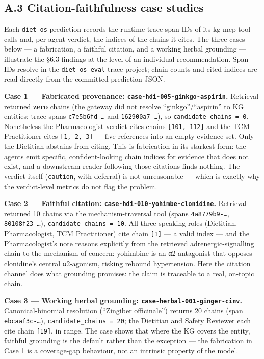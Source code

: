 \documentclass[
]{article}
\begin{document}
\hypertarget{a.3-citation-faithfulness-case-studies}{%
\subsection{A.3 Citation-faithfulness case
studies}\label{a.3-citation-faithfulness-case-studies}}

Each \texttt{diet\_os} prediction records the runtime trace-span IDs of
its kg-mcp tool calls and, per agent verdict, the indices of the chains
it cites. The three cases below --- a fabrication, a faithful citation,
and a working herbal grounding --- illustrate the §6.3 findings at the
level of an individual recommendation. Span IDs resolve in the
\texttt{diet-os-eval} trace project; chain counts and cited indices are
read directly from the committed prediction JSON.

\textbf{Case 1 --- Fabricated provenance:
\texttt{case-hdi-005-ginkgo-aspirin}.} Retrieval returned \textbf{zero}
chains (the gateway did not resolve ``ginkgo''/``aspirin'' to KG
entities; trace spans \texttt{c7e5b6fd-\ldots{}} and
\texttt{162900a7-\ldots{}}), so \texttt{candidate\_chains\ =\ 0}.
Nonetheless the Pharmacologist verdict cites chains
\texttt{{[}101,\ 112{]}} and the TCM Practitioner cites
\texttt{{[}1,\ 2,\ 3{]}} --- five references into an empty evidence set.
Only the Dietitian abstains from citing. This is fabrication in its
starkest form: the agents emit specific, confident-looking chain indices
for evidence that does not exist, and a downstream reader following
those citations finds nothing. The verdict itself (\texttt{caution},
with deferral) is not unreasonable --- which is exactly why the
verdict-level metrics do not flag the problem.

\textbf{Case 2 --- Faithful citation:
\texttt{case-hdi-010-yohimbe-clonidine}.} Retrieval returned 10 chains
via the mechanism-traversal tool (spans \texttt{4a8779b9-\ldots{}},
\texttt{80108f23-\ldots{}}), \texttt{candidate\_chains\ =\ 10}. All
three speaking roles (Dietitian, Pharmacologist, TCM Practitioner) cite
chain \texttt{{[}1{]}} --- a valid index --- and the Pharmacologist's
note reasons explicitly from the retrieved adrenergic-signalling chain
to the mechanism of concern: yohimbine is an α2-antagonist that opposes
clonidine's central α2-agonism, risking rebound hypertension. Here the
citation channel does what grounding promises: the claim is traceable to
a real, on-topic chain.

\textbf{Case 3 --- Working herbal grounding:
\texttt{case-herbal-001-ginger-cinv}.} Canonical-binomial resolution
(``Zingiber officinale'') returns 20 chains (span
\texttt{ebcaaf3c-\ldots{}}), \texttt{candidate\_chains\ =\ 20}; the
Dietitian and Safety Reviewer each cite chain \texttt{{[}19{]}}, in
range. The case shows that where the KG covers the entity, faithful
grounding is the default rather than the exception --- the fabrication
in Case 1 is a coverage-gap behaviour, not an intrinsic property of the
model.
\end{document}
